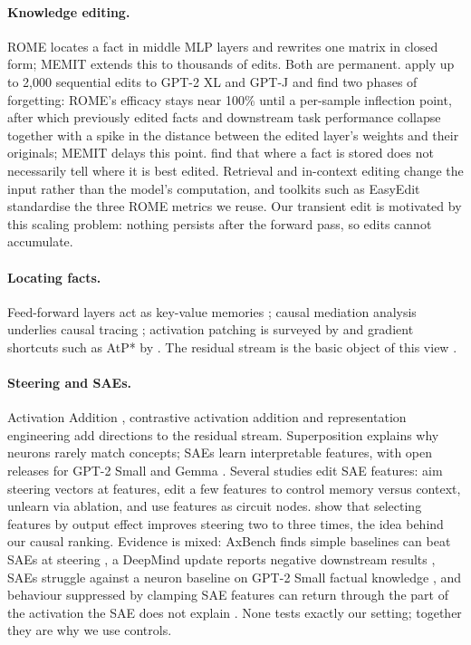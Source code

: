 \documentclass[11pt,twocolumn]{article}
\begin{document}
\paragraph{Knowledge editing.} ROME \citep{meng2022} locates a fact in middle MLP layers and rewrites one matrix in closed form; MEMIT \citep{meng2023} extends this to thousands of edits. Both are permanent. \citet{gupta2024} apply up to 2,000 sequential edits to GPT-2 XL and GPT-J and find two phases of forgetting: ROME's efficacy stays near 100\% until a per-sample inflection point, after which previously edited facts and downstream task performance collapse together with a spike in the distance between the edited layer's weights and their originals; MEMIT delays this point. \citet{hase2023} find that where a fact is stored does not necessarily tell where it is best edited. Retrieval \citep{lewis2020} and in-context editing \citep{zheng2023} change the input rather than the model's computation, and toolkits such as EasyEdit \citep{wang2024} standardise the three ROME metrics we reuse. Our transient edit is motivated by this scaling problem: nothing persists after the forward pass, so edits cannot accumulate.

\paragraph{Locating facts.} Feed-forward layers act as key-value memories \citep{geva2021}; causal mediation analysis \citep{pearl2001,vig2020} underlies causal tracing \citep{meng2022}; activation patching is surveyed by \citet{heimersheim2024} and gradient shortcuts such as AtP* by \citet{kramar2024}. The residual stream is the basic object of this view \citep{elhage2021}.

\paragraph{Steering and SAEs.} Activation Addition \citep{turner2023}, contrastive activation addition \citep{rimsky2024} and representation engineering \citep{zou2023} add directions to the residual stream. Superposition \citep{elhage2022} explains why neurons rarely match concepts; SAEs \citep{bricken2023,cunningham2024,templeton2024} learn interpretable features, with open releases for GPT-2 Small \citep{bloom2024gpt2} and Gemma \citep{lieberum2024}. Several studies edit SAE features: \citet{chalnev2024} aim steering vectors at features, \citet{zhao2025} edit a few features to control memory versus context, \citet{farrell2024} unlearn via ablation, and \citet{marks2025} use features as circuit nodes. \citet{arad2025} show that selecting features by output effect improves steering two to three times, the idea behind our causal ranking. Evidence is mixed: AxBench finds simple baselines can beat SAEs at steering \citep{wu2025}, a DeepMind update reports negative downstream results \citep{smith2025}, SAEs struggle against a neuron baseline on GPT-2 Small factual knowledge \citep{chaudhary2024}, and behaviour suppressed by clamping SAE features can return through the part of the activation the SAE does not explain \citep{cui2026}. None tests exactly our setting; together they are why we use controls.
\end{document}

